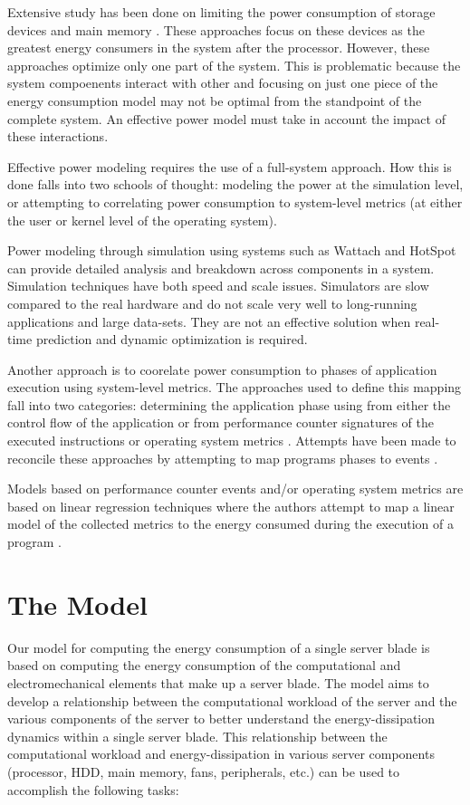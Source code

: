 \documentclass[times, 10pt,onecolumn]{article}
\begin{document}
Extensive study has been done on limiting the power consumption of
storage devices \cite{Pinheiro2004} and main memory \cite{Diniz2007}.
These approaches focus on these devices as the greatest energy consumers
in the system after the processor.  However, these approaches optimize
only one part of the system.  This is problematic because the system
compoenents interact with other and focusing on just one piece of the
energy consumption model may not be optimal from the standpoint of the
complete system.  An effective power model must take in account the
impact of these interactions.

Effective power modeling requires the use of a full-system approach.
How this is done falls into two schools of thought: modeling the power
at the simulation level, or attempting to correlating power consumption
to system-level metrics (at either the user or kernel level of the
operating system).

Power modeling through simulation using systems such as Wattach
\cite{Brooks2000} and HotSpot
\cite{Skadron2004} can provide detailed analysis and breakdown across
components in a system.    Simulation techniques have both speed and
scale issues.  Simulators are slow compared to the real hardware and do
not scale very well to long-running applications and large
data-sets. They are not an effective solution when real-time prediction
and dynamic optimization is required.

Another approach is to coorelate power consumption to phases of
application execution using system-level metrics.  The approaches used
to define this mapping fall into two categories: determining the
application phase using from either the control flow of the application
\cite{Hu2005} \cite{Iyer2001} \cite{Sherwood2003} or from performance
counter signatures of the executed instructions or operating system
metrics \cite{Bellosa2003} \cite{Isci2003a} \cite{Isci2003b}
\cite{Contreras2005} \cite{Economou2006}.  Attempts have been made to
reconcile these approaches by attempting to map programs phases to
events \cite{Isci2006}.

Models based on performance counter events and/or operating system
metrics are based on linear regression techniques where the authors
attempt to map a linear model of the collected metrics to the energy
consumed during the execution of a program 
 \cite{Isci2003c} \cite{Contreras2005}\cite{Bircher2007}.  

\section{The Model}
\label{sec:model}
Our model for computing the energy consumption of a single server blade
is based on computing the energy consumption of the 
computational and electromechanical elements that make up a server
blade. The model aims to develop a relationship between the
computational workload of the server and the various components of the
server to better understand the energy-dissipation dynamics within a
single server blade. This relationship between the computational
workload and energy-dissipation in various server components (processor,
HDD, main memory, fans, peripherals, etc.) can be used to accomplish the
following tasks:
\end{document}
